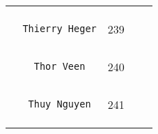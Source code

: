 \documentclass[]{article}
\begin{document}
\begin{longtable}[c]{@{}llll@{}}
\begin{minipage}[t]{0.13\columnwidth}
\end{minipage} & \begin{minipage}[t]{0.15\columnwidth}\raggedright
\end{minipage}
\\\noalign{\medskip}
\begin{minipage}[t]{0.39\columnwidth}\raggedright
\begin{verbatim}
  Thierry Heger
\end{verbatim}
\end{minipage} & \begin{minipage}[t]{0.10\columnwidth}\raggedright
239
\end{minipage} & \begin{minipage}[t]{0.13\columnwidth}\raggedright
\end{minipage} & \begin{minipage}[t]{0.15\columnwidth}\raggedright
\end{minipage}
\\\noalign{\medskip}
\begin{minipage}[t]{0.39\columnwidth}\raggedright
\begin{verbatim}
    Thor Veen
\end{verbatim}
\end{minipage} & \begin{minipage}[t]{0.10\columnwidth}\raggedright
240
\end{minipage} & \begin{minipage}[t]{0.13\columnwidth}\raggedright
\end{minipage} & \begin{minipage}[t]{0.15\columnwidth}\raggedright
\end{minipage}
\\\noalign{\medskip}
\begin{minipage}[t]{0.39\columnwidth}\raggedright
\begin{verbatim}
   Thuy Nguyen
\end{verbatim}
\end{minipage} & \begin{minipage}[t]{0.10\columnwidth}\raggedright
241
\end{minipage} & \begin{minipage}[t]{0.13\columnwidth}\raggedright
\end{minipage} & \begin{minipage}[t]{0.15\columnwidth}\raggedright
\end{minipage}
\\\noalign{\medskip}
\begin{minipage}[t]{0.39\columnwidth}\raggedright

\end{minipage}
\end{longtable}
\end{document}
